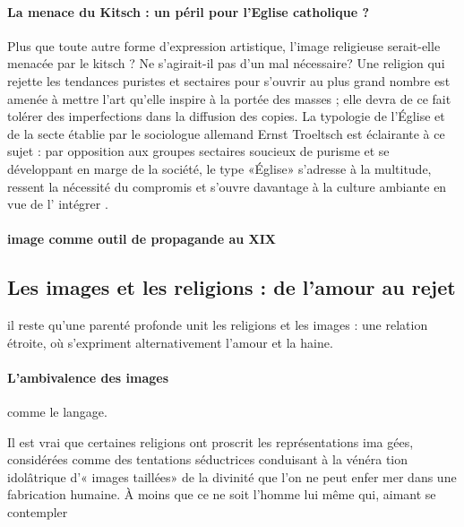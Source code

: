 \paragraph{La menace du Kitsch : un péril pour l'Eglise catholique ?} Plus que toute autre forme d'expression artistique, l'image religieuse serait-elle menacée par le kitsch ? Ne s'agirait-il pas d'un mal nécessaire? Une religion qui rejette les tendances puristes et sectaires pour s'ouvrir au plus grand nombre est amenée à mettre l'art qu'elle inspire à la portée des masses ; elle devra de ce fait tolérer des imperfections dans la diffusion des copies. La typologie de l'Église et de la secte établie par le sociologue allemand Ernst Troeltsch est éclairante à ce sujet : par opposition aux groupes sectaires soucieux de purisme et se développant en marge de la société, le type «Église» s'adresse à la multitude, ressent la nécessité du compromis et s'ouvre davantage à la culture ambiante en vue de l' intégrer .


\paragraph{image comme outil de propagande au XIX}


\subsection{Les images et les religions : de l'amour au rejet}
il reste qu'une parenté profonde unit les religions et les images : une relation étroite, où s'expriment alternativement l'amour et la haine.

\paragraph{L'ambivalence des images} comme le langage.

Il est vrai que certaines religions ont proscrit les représentations ima­ gées, considérées comme des tentations séductrices conduisant à la vénéra­ tion idolâtrique d'« images taillées» de la divinité que l'on ne peut enfer­ mer dans une fabrication humaine. À moins que ce ne soit l'homme lui­ même qui, aimant se contempler 

